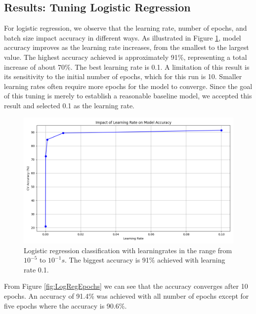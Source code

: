 \subsection{Results: Tuning Logistic Regression }
For logistic regression, we observe that the learning rate, number of epochs, and batch size impact accuracy in different ways. As illustrated in Figure \ref{fig:LogRegLearningRate}, model accuracy improves as the learning rate increases, from the smallest to the largest value. The highest accuracy achieved is approximately 91\%, representing a total increase of about 70\%. The best learning rate is 0.1. A limitation of this result is its sensitivity to the initial number of epochs, which for this run is 10. Smaller learning rates often require more epochs for the model to converge. Since the goal of this tuning is merely to establish a reasonable baseline model, we accepted this result and selected 0.1 as the learning rate.

\begin{figure}[H]
    \centering
    \includegraphics[width=\textwidth]{results/logreg/learning_rate_study.png}
    \caption{Logistic regression classification with learningrates in the range from $10^{-5}$ to $10^{-1}s$. The biggest accuracy is 91\% achieved with learning rate 0.1. }
    \label{fig:LogRegLearningRate}
\end{figure}

\newpage
From Figure \ref{fig:LogRegEpochs} we can see that the accuracy converges after 10 epochs. An accuracy of 91.4\% was achieved with all number of epochs except for five epochs where the accuracy is 90.6\%. 

